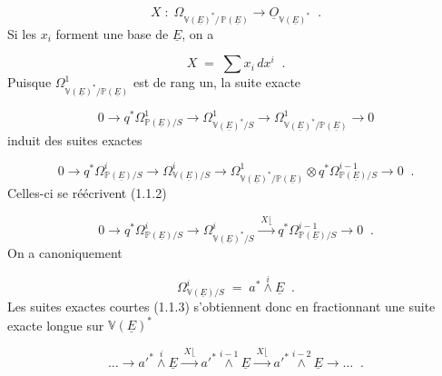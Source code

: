 \begin{equation}\tag{1.1.2}
X \;:\; \Omega_{\mathbb{V}(\underline{E})^*/\,\mathbb{P}(\underline{E})} \longrightarrow \underline{O}_{\mathbb{V}(\underline{E})^*} \;\; .
\end{equation}
Si les $x_i$ forment une base de $\underline{E}$, on a

\begin{equation*}
X \;=\; \sum x_i \, dx^i \;\; .
\end{equation*}
Puisque $\Omega^1_{\mathbb{V}(\underline{E})^*/\mathbb{P}(\underline{E})}$ est de rang un, la suite exacte

\begin{equation*}
0 \longrightarrow q^*\Omega^1_{\mathbb{P}(\underline{E})/S} \longrightarrow \Omega^1_{\mathbb{V}(\underline{E})^*/S} \longrightarrow \Omega^1_{\mathbb{V}(\underline{E})^*/\mathbb{P}(\underline{E})} \longrightarrow 0
\end{equation*}
induit des suites exactes

\begin{equation*}
0 \longrightarrow q^*\Omega^i_{\mathbb{P}(\underline{E})/S} \longrightarrow \Omega^i_{\mathbb{V}(\underline{E})/S} \longrightarrow \Omega^1_{\mathbb{V}(\underline{E})^*/\mathbb{P}(\underline{E})} \otimes q^*\Omega^{i-1}_{\mathbb{P}(\underline{E})/S} \longrightarrow 0 \;\; .
\end{equation*}
Celles-ci se réécrivent (1.1.2)

\begin{equation}\tag{1.1.3}
0 \longrightarrow q^*\Omega^i_{\mathbb{P}(\underline{E})/S} \longrightarrow \Omega^i_{\mathbb{V}(\underline{E})^*/S} \xrightarrow{\;X\lfloor\;} q^*\Omega^{i-1}_{\mathbb{P}(\underline{E})/S} \longrightarrow 0 \;\; .
\end{equation}
On a canoniquement

\begin{equation}\tag{1.1.4}
\Omega^i_{\mathbb{V}(\underline{E})/S} \;=\; a^* \overset{i}{\wedge} \underline{E} \;\; .
\end{equation}
Les suites exactes courtes (1.1.3) s'obtiennent donc en fractionnant une suite exacte longue sur $\mathbb{V}(\underline{E})^*$

\begin{equation}\tag{1.1.5}
\ldots \longrightarrow {a'}^{*} \overset{i}{\wedge} \underline{E} \xrightarrow{\;X\lfloor\;} {a'}^{*} \overset{i-1}{\wedge} \underline{E} \xrightarrow{\;X\lfloor\;} {a'}^{*} \overset{i-2}{\wedge} \underline{E} \longrightarrow \ldots \;\; .
\end{equation}

